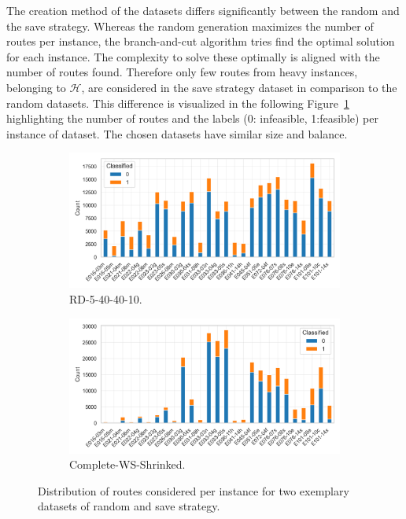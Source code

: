 The creation method of the datasets differs significantly between the random and the save strategy. Whereas the random
generation maximizes the number of routes per instance, the branch-and-cut algorithm tries
find the optimal solution for each instance. The complexity to solve these optimally is aligned with the number of routes found.
Therefore only few routes from heavy instances, belonging to $\mathcal{H}$, are considered in the save strategy dataset
in comparison to the random datasets. This difference is visualized in the following Figure~\ref{fig:comparison_noroutes_perInstancce}
highlighting the number of routes and the labels (0: infeasible, 1:feasible) per instance of \gendreauDataSet dataset. The chosen
datasets have similar size and balance.

\begin{figure}[ht]
    \centering
    \begin{subfigure}[t]{.5\textwidth}
        \centering
        \includegraphics[width=\linewidth]{pictures/dataset_structure/distribution_plot_RandomData_5_40_40_10.png}
        \caption{RD-5-40-40-10.}
    \end{subfigure}%
    \begin{subfigure}[t]{.5\textwidth}
        \centering
        \includegraphics[width=\linewidth]{pictures/dataset_structure/distribution_plot_gendreau_28880_600_WS_shrinked094.png}
        \caption{Complete-WS-Shrinked.}
    \end{subfigure}
    \caption[Distribution of routes considered per instance for two exemplary datasets of random and save strategy.]
    {Distribution of routes considered per instance for two exemplary datasets of random and save strategy.}
    \label{fig:comparison_noroutes_perInstancce}
\end{figure}

